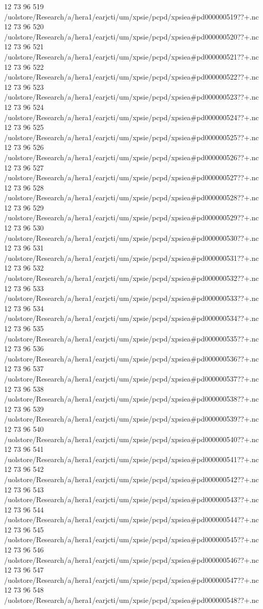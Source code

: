 12 73 96
519
/uolstore/Research/a/hera1/earjcti/um/xpsie/pcpd/xpsiea#pd000000519??+.nc
12 73 96
520
/uolstore/Research/a/hera1/earjcti/um/xpsie/pcpd/xpsiea#pd000000520??+.nc
12 73 96
521
/uolstore/Research/a/hera1/earjcti/um/xpsie/pcpd/xpsiea#pd000000521??+.nc
12 73 96
522
/uolstore/Research/a/hera1/earjcti/um/xpsie/pcpd/xpsiea#pd000000522??+.nc
12 73 96
523
/uolstore/Research/a/hera1/earjcti/um/xpsie/pcpd/xpsiea#pd000000523??+.nc
12 73 96
524
/uolstore/Research/a/hera1/earjcti/um/xpsie/pcpd/xpsiea#pd000000524??+.nc
12 73 96
525
/uolstore/Research/a/hera1/earjcti/um/xpsie/pcpd/xpsiea#pd000000525??+.nc
12 73 96
526
/uolstore/Research/a/hera1/earjcti/um/xpsie/pcpd/xpsiea#pd000000526??+.nc
12 73 96
527
/uolstore/Research/a/hera1/earjcti/um/xpsie/pcpd/xpsiea#pd000000527??+.nc
12 73 96
528
/uolstore/Research/a/hera1/earjcti/um/xpsie/pcpd/xpsiea#pd000000528??+.nc
12 73 96
529
/uolstore/Research/a/hera1/earjcti/um/xpsie/pcpd/xpsiea#pd000000529??+.nc
12 73 96
530
/uolstore/Research/a/hera1/earjcti/um/xpsie/pcpd/xpsiea#pd000000530??+.nc
12 73 96
531
/uolstore/Research/a/hera1/earjcti/um/xpsie/pcpd/xpsiea#pd000000531??+.nc
12 73 96
532
/uolstore/Research/a/hera1/earjcti/um/xpsie/pcpd/xpsiea#pd000000532??+.nc
12 73 96
533
/uolstore/Research/a/hera1/earjcti/um/xpsie/pcpd/xpsiea#pd000000533??+.nc
12 73 96
534
/uolstore/Research/a/hera1/earjcti/um/xpsie/pcpd/xpsiea#pd000000534??+.nc
12 73 96
535
/uolstore/Research/a/hera1/earjcti/um/xpsie/pcpd/xpsiea#pd000000535??+.nc
12 73 96
536
/uolstore/Research/a/hera1/earjcti/um/xpsie/pcpd/xpsiea#pd000000536??+.nc
12 73 96
537
/uolstore/Research/a/hera1/earjcti/um/xpsie/pcpd/xpsiea#pd000000537??+.nc
12 73 96
538
/uolstore/Research/a/hera1/earjcti/um/xpsie/pcpd/xpsiea#pd000000538??+.nc
12 73 96
539
/uolstore/Research/a/hera1/earjcti/um/xpsie/pcpd/xpsiea#pd000000539??+.nc
12 73 96
540
/uolstore/Research/a/hera1/earjcti/um/xpsie/pcpd/xpsiea#pd000000540??+.nc
12 73 96
541
/uolstore/Research/a/hera1/earjcti/um/xpsie/pcpd/xpsiea#pd000000541??+.nc
12 73 96
542
/uolstore/Research/a/hera1/earjcti/um/xpsie/pcpd/xpsiea#pd000000542??+.nc
12 73 96
543
/uolstore/Research/a/hera1/earjcti/um/xpsie/pcpd/xpsiea#pd000000543??+.nc
12 73 96
544
/uolstore/Research/a/hera1/earjcti/um/xpsie/pcpd/xpsiea#pd000000544??+.nc
12 73 96
545
/uolstore/Research/a/hera1/earjcti/um/xpsie/pcpd/xpsiea#pd000000545??+.nc
12 73 96
546
/uolstore/Research/a/hera1/earjcti/um/xpsie/pcpd/xpsiea#pd000000546??+.nc
12 73 96
547
/uolstore/Research/a/hera1/earjcti/um/xpsie/pcpd/xpsiea#pd000000547??+.nc
12 73 96
548
/uolstore/Research/a/hera1/earjcti/um/xpsie/pcpd/xpsiea#pd000000548??+.nc
